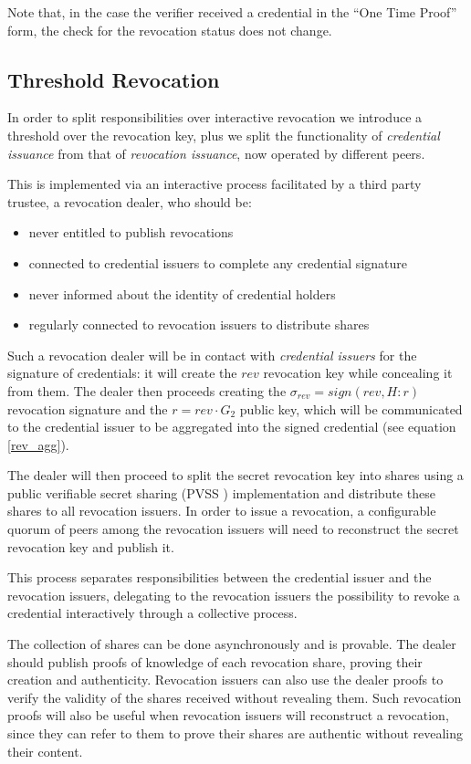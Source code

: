 Note that, in the case the verifier received a credential in the ``One
Time Proof'' form, the check for the revocation status does not
change.

\subsection{Threshold Revocation}

In order to split responsibilities over interactive revocation we
introduce a threshold over the revocation key, plus we split the
functionality of \textit{credential issuance} from that of
\textit{revocation issuance}, now operated by different peers.

This is implemented via an interactive process facilitated by a third
party trustee, a revocation dealer, who should be:
\begin{itemize}
    \item never entitled to publish revocations
    \item connected to credential issuers to complete any credential
      signature
    \item never informed about the identity of credential holders
    \item regularly connected to revocation issuers to distribute
      shares
\end{itemize}

Such a revocation dealer will be in contact with \textit{credential
  issuers} for the signature of credentials: it will create the $rev$
revocation key while concealing it from them. The dealer then proceeds
creating the $\sigma_{rev} = sign(rev, H : r)$ revocation signature
and the $r = rev \cdot G_2$ public key, which will be communicated to
the credential issuer to be aggregated into the signed credential (see
equation \eqref{rev_agg}).

The dealer will then proceed to split the secret revocation key into
shares using a public verifiable secret sharing (PVSS \cite{pvss})
implementation and distribute these shares to all revocation
issuers. In order to issue a revocation, a configurable quorum of
peers among the revocation issuers will need to reconstruct the secret
revocation key and publish it.

This process separates responsibilities between the credential issuer
and the revocation issuers, delegating to the revocation issuers the
possibility to revoke a credential interactively through a collective
process.

The collection of shares can be done asynchronously and is provable.
The dealer should publish proofs of knowledge of each revocation
share, proving their creation and authenticity. Revocation issuers can
also use the dealer proofs to verify the validity of the shares
received without revealing them. Such revocation proofs will also be
useful when revocation issuers will reconstruct a revocation, since
they can refer to them to prove their shares are authentic without
revealing their content.

